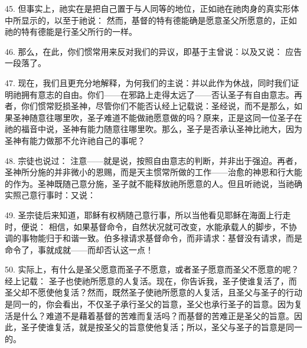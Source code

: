 45. 但事实上，祂实在是把自己置于与人同等的地位，正如祂在祂肉身的真实形体中所显示的，以至于祂说： 然而，基督的特有德能确是愿意圣父所愿意的，正如祂的特有德能是行圣父所行的一样。\par

46. 那么，在此，你们惯常用来反对我们的异议，即基于主曾说：以及又说： 应告一段落了。\par

\par

47. 现在，我们且更充分地解释，为何我们的主说：并以此作为休战，同时我们证明祂拥有意志的自由。你们——在邪路上走得太远了——否认圣子有自由意志。再者，你们惯常贬损圣神，尽管你们不能否认经上记载说：圣经说，而不是那么，如果圣神随意往哪里吹，圣子难道不能做祂愿意做的吗？原来，正是这同一位圣子在祂的福音中说，圣神有能力随意往哪里吹。那么，圣子是否承认圣神比祂大，因为圣神有能力做那不允许祂自己的事呢？\par

48. 宗徒也说过： 注意——就是说，按照自由意志的判断，并非出于强迫。再者，圣神所分施的并非微小的恩赐，而是天主惯常所做的工作——治愈的神恩和行大能的作为。圣神既随己意分施，圣子就不能释放祂所愿意的人。但且听祂说，当祂确实照己意行事时：又说：\par

49. 圣宗徒后来知道，耶稣有权柄随己意行事，所以当他看见耶稣在海面上行走时，便说： 相信，如果基督命令，自然状况就可改变，水能承载人的脚步，不协调的事物能归于和谐一致。伯多禄请求基督命令，而非请求：基督没有请求，而是命令了，事就成就——而却否认这一点！\par

50. 实际上，有什么是圣父愿意而圣子不愿意，或者圣子愿意而圣父不愿意的呢？经上记载： 圣子也使祂所愿意的人复活。现在，你告诉我，圣子使谁复活了，而圣父却不愿使他复活？然而，既然圣子使祂所愿意的人复活，且圣父与圣子的行动是同一的，你会看出，不仅圣子承行圣父的旨意，圣父也承行圣子的旨意。因为复活是什么？难道不是藉着基督的苦难而复活吗？而基督的苦难正是圣父的旨意。因此，圣子使谁复活，就是按圣父的旨意使他复活；所以，圣父与圣子的旨意是同一的。\par

